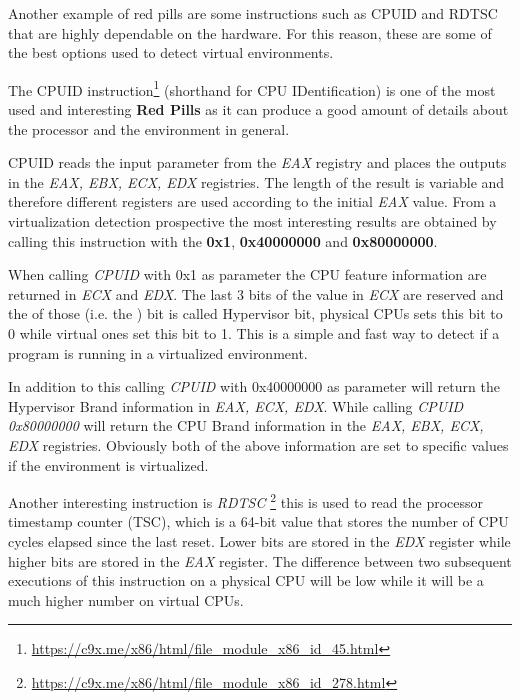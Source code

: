 Another example of red pills are some instructions such as CPUID and RDTSC that are highly dependable on the hardware. For this reason, these are some of the best options used to detect virtual environments.




The CPUID instruction\footnote{\url{https://c9x.me/x86/html/file_module_x86_id_45.html}} (shorthand for CPU IDentification) is one of the most used and interesting \textbf{Red Pills} as it can produce a good amount of details about the processor and the environment in general.

CPUID reads the input parameter from the \textit{EAX} registry and places the outputs in the \textit{EAX, EBX, ECX, EDX} registries. The length of the result is variable and therefore different registers are used according to the initial \textit{EAX} value. From a virtualization detection prospective the most interesting results are obtained by calling this instruction with the \textbf{0x1}, \textbf{0x40000000} and \textbf{0x80000000}\cite{CPUID}. 

When calling \textit{CPUID} with 0x1 as parameter the CPU feature information are returned in \textit{ECX} and \textit{EDX}. The last 3 bits of the value in \textit{ECX} are reserved and the  of those (i.e. the ) bit is called Hypervisor bit, physical CPUs sets this bit to 0 while virtual ones set this bit to 1. This is a simple and fast way to detect if a program is running in a virtualized environment. 

In addition to this calling \textit{CPUID} with 0x40000000 as parameter will return the Hypervisor Brand information in \textit{EAX, ECX, EDX}. While calling \textit{CPUID 0x80000000} will return the CPU Brand information in the \textit{EAX, EBX, ECX, EDX} registries. Obviously both of the above information are set to specific values if the environment is virtualized. 

Another interesting instruction is \textit{RDTSC} \footnote{\url{https://c9x.me/x86/html/file_module_x86_id_278.html}} this is used to read the processor timestamp counter (TSC), which is a 64-bit value that stores the number of CPU cycles elapsed since the last reset. Lower bits are stored in the \textit{EDX} register while higher bits are stored in the \textit{EAX} register. The difference between two subsequent executions of this instruction on a physical CPU will be low while it will be a much higher number on virtual CPUs.

